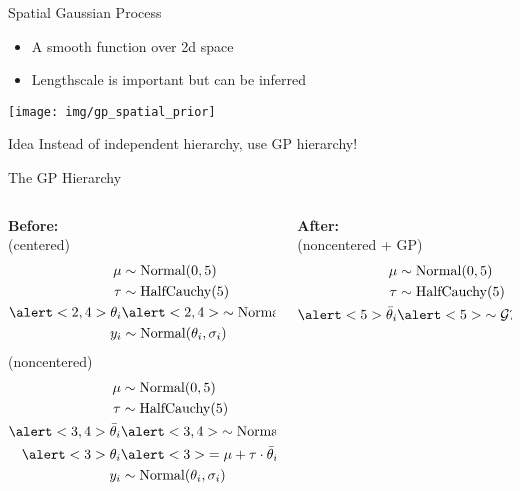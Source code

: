 \documentclass{beamer}
\begin{document}
\begin{frame}{Spatial Gaussian Process}
    \begin{itemize}
        \item A smooth function over 2d space
        \item Lengthscale is important but can be inferred
    \end{itemize}
    \texttt{[image: img/gp\_spatial\_prior]}
    \pause
    \begin{block}{Idea}
    Instead of independent hierarchy, use GP hierarchy!
    \end{block}
\end{frame}
\begin{frame}{The GP Hierarchy}
\begin{columns}[t]
    \begin{column}{0.5\linewidth}
    \textbf{Before:}\\(centered)
\begin{align*}
                \mu &\sim \operatorname{Normal}(0, 5)\\
    \tau &\sim \operatorname{HalfCauchy}(5)\\
    \alert<2,4>{\theta_i} &\alert<2,4>{\sim \operatorname{Normal}(\mu, \tau)}\\
    y_i &\sim \operatorname{Normal}(\theta_i, \sigma_i)
            \end{align*}
    (noncentered)
    \begin{align*}
        \mu &\sim \operatorname{Normal}(0, 5)\\
        \tau &\sim \operatorname{HalfCauchy}(5)\\
        \alert<3,4>{\bar\theta_i} &\alert<3,4>{\sim \operatorname{Normal}(0, 1)}\\
        \alert<3>{\theta_i} &\alert<3>{= \mu + \tau \cdot \bar\theta_i} \\
        y_i &\sim \operatorname{Normal}(\theta_i, \sigma_i)
    \end{align*}
    \end{column}
    \begin{column}{0.5\linewidth}
    \textbf{After:} \\(noncentered + GP)
    \begin{align*}
        \mu &\sim \operatorname{Normal}(0, 5)\\
        \tau &\sim \operatorname{HalfCauchy}(5)\\
        \alert<5>{\bar\theta_i} &\alert<5>{\sim \mathcal{GP}(x_i)}\\

\end{align*}
\end{column}
\end{columns}
\end{frame}
\end{document}
